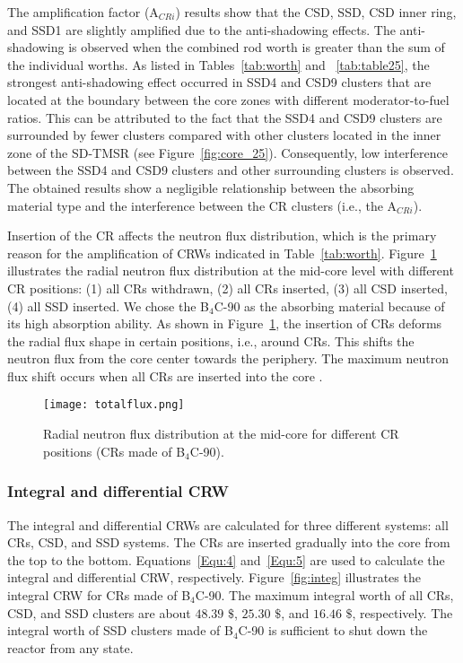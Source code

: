 The amplification factor (A$_{CRi}$) results show that the CSD, SSD, CSD inner 
ring, and SSD1 are slightly amplified due to the anti-shadowing effects. The 
anti-shadowing is observed when the combined rod worth is greater than the sum 
of the individual worths. As listed in Tables~\ref{tab:worth} and ~\ref{tab:table25}, the strongest anti-shadowing effect occurred in 
SSD4 and CSD9 clusters that are located at the boundary between the core zones 
with different moderator-to-fuel ratios. This can be attributed to the fact that the SSD4 and CSD9 clusters are surrounded by fewer clusters compared with other clusters located in the inner zone of the SD-TMSR (see Figure~\ref{fig:core_25}). Consequently, low interference between the SSD4 and CSD9 clusters and other surrounding clusters is observed. The obtained results show a negligible relationship between the absorbing material type and the interference between the CR clusters (i.e., the A$_{CRi}$).

Insertion of the CR affects the neutron flux distribution, which is 
the primary reason for the amplification of CRWs indicated in 
Table~\ref{tab:worth}. Figure~\ref{fig:totalflux} illustrates the radial 
neutron flux distribution at the mid-core level with different CR positions: 
(1) all CRs withdrawn, (2) all CRs inserted, (3) all CSD inserted, (4) all SSD 
inserted. We chose the B$_4$C-90 as the absorbing material because of its high 
absorption ability. As shown in Figure~\ref{fig:totalflux}, the insertion of 
CRs deforms the radial flux shape in certain positions, i.e., around CRs.
This shifts the neutron flux from the core center towards the 
periphery. The maximum neutron flux shift occurs when all CRs are inserted 
into the core \cite{girardin2007control}.
\begin{figure}[!ht]
	\centering
	\texttt{[image: totalflux.png]}
	\vspace{-0.5in}
	\caption{Radial neutron flux distribution at the mid-core for different 
	CR positions (CRs made of B$_4$C-90).} 
	\label{fig:totalflux}
\end{figure}
 

\subsubsection{Integral and differential CRW}

The integral and differential CRWs are calculated for three 
different systems: all CRs, CSD, and SSD systems. The CRs are 
inserted gradually into the core from the top to the bottom. 
Equations~\ref{Equ:4} and~\ref{Equ:5} are used to calculate the integral and 
differential CRW, respectively. Figure~\ref{fig:integ} illustrates the integral CRW for CRs 
made of B$_4$C-90. The maximum integral worth of all CRs, CSD, and SSD 
clusters are about $48.39$ $\$$, $25.30$ $\$$, and $16.46$ $\$$, respectively. The 
integral worth of SSD clusters made of B$_4$C-90 is sufficient to shut down the reactor from any 
state.

